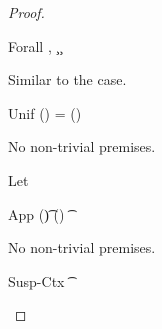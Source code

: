 \documentclass[acmsmall,screen,nonacm,review]{acmart}
\begin{document}
\begin{proof}
\begin{itemize}
  \proofcasederivation
      {Forall}
      {\forall \gt,\, \semenv\where{\tv \is \gt} \th \c}
      {\semenv \th \cfor \tv \c}

      \begin{llproof}
	Similar to the  case.
      \end{llproof}

  \proofcasederivation
      {Unif}
      {\semenv(\tone) = \semenv(\ttwo)}
      {\semenv \th \cunif \tone \ttwo}

      \begin{llproof}
	No non-trivial premises.
      \end{llproof}

  \proofcasederivation
      {Let}
      {\semenv \th \cexists \tv \cone \\ \semenv\where{\x \is \semenv(\cabs \tv \c)} \th \ctwo}
      {\semenv \th \clet \x \tv \cone \ctwo}

      \begin{llproof}
\Hand   {}
\Hand   \continueltPf{\cmeasure {\clet \x \tv \cone \ctwo}}{\ditto}
\Hand   {}
      \end{llproof}

  \proofcasederivation
      {App}
      {\semenv(\t) \in \semenv(\x)}
      {\semenv \th \capp \x \t}

      \begin{llproof}
	No non-trivial premises.
      \end{llproof}

  \proofcasederivation
      {Susp-Ctx}
      {\Cshape \C \t \sh \\ \semenv \th \C\where{\cmatched \t \sh \cbrs}}
      {\semenv \th \C\where{\cmatch \t \cbrs}}


\end{itemize}
\end{proof}
\end{document}
